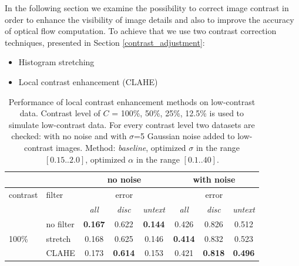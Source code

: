 In the following section we examine the possibility to correct image contrast in order to enhance the visibility of image details and also to improve the accuracy of optical flow computation. To achieve that we use two contrast correction techniques, presented in Section \ref{contrast_adjustment}:
\begin{itemize}
\item Histogram stretching
\item Local contrast enhancement (CLAHE)
\end{itemize}   

\begin{table}[ht]  \scriptsize
  \centering
  \caption{Performance of local contrast enhancement methods on low-contrast data. Contrast level of $C$ = 100\%, 50\%, 25\%, 12.5\% is used to simulate low-contrast data. For every contrast level two datasets are checked: with no noise and with $\sigma$=5 Gaussian noise added to low-contrast images.  Method: \textit{baseline}, optimized $\sigma$ in the range $[0.15 .. 2.0]$, optimized $\alpha$ in the range $[0.1 .. 40]$.}
    \begin{tabular}{rrcrrcrr}
    \toprule
          &       & \multicolumn{3}{c}{no noise } & \multicolumn{3}{c}{with noise} \\
    \midrule
    \multicolumn{1}{l}{contrast} & \multicolumn{1}{l}{filter} & \multicolumn{3}{c}{error} & \multicolumn{3}{c}{error} \\
     \midrule
     
    \multicolumn{1}{l}{} & \multicolumn{1}{l}{} & \textit{all} & \multicolumn{1}{c}{\textit{disc}} & \multicolumn{1}{c}{\textit{untext}} & \textit{all} & \multicolumn{1}{c}{\textit{disc}} & \multicolumn{1}{c}{\textit{untext}} \\
    
     \midrule
     \midrule
    \multicolumn{1}{l}{\multirow{3}[1]{*}{100\%}} & \multicolumn{1}{l}{no filter} & \textbf{0.167} & \multicolumn{1}{c}{0.622} & \multicolumn{1}{c}{\textbf{0.144}} & 0.426 & \multicolumn{1}{c}{0.826} & \multicolumn{1}{c}{0.512} \\
    \multicolumn{1}{l}{} & \multicolumn{1}{l}{stretch} & 0.168 & \multicolumn{1}{c}{0.625} & \multicolumn{1}{c}{0.146} & \textbf{0.414} & \multicolumn{1}{c}{0.832} & \multicolumn{1}{c}{0.523} \\
    \multicolumn{1}{l}{} & \multicolumn{1}{l}{CLAHE} & 0.173 & \multicolumn{1}{c}{\textbf{0.614}} & \multicolumn{1}{c}{0.153} & 0.421 & \multicolumn{1}{c}{\textbf{0.818}} & \multicolumn{1}{c}{\textbf{0.496}} \\
     \midrule
     

\end{tabular}
\end{table}
